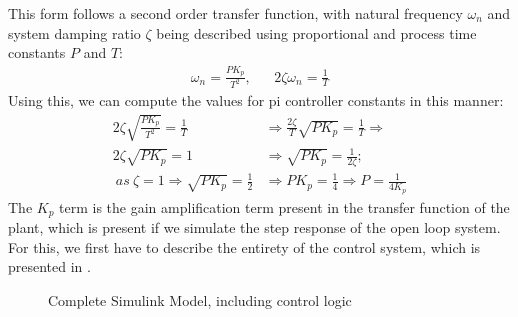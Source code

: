 This form follows a second order transfer function, with natural frequency $\omega_n$ and system damping ratio $\zeta$ being described using proportional and process time constants $P$ and $T$:
\begin{align*}
    \omega_n = \frac{P K_p}{T^2}, && 2 \zeta \omega_n = \frac{1}{T}
\end{align*}
Using this, we can compute the values for \gls{pi} controller constants in this manner:
\begin{equation}
    \begin{split}
        2 \zeta \sqrt{\frac{P K_p}{T^2}} = \frac{1}{T} &\Rightarrow \frac{2 \zeta}{T} \sqrt{P K_p} = \frac{1}{T} \Rightarrow \\
        2 \zeta \sqrt{P K_p} = 1 &\Rightarrow \sqrt{P K_p} = \frac{1}{2 \zeta}; \\
        \ as \ \zeta = 1 \Rightarrow \sqrt{P K_p} = \frac{1}{2} &\Rightarrow P K_p = \frac{1}{4} \Rightarrow P = \frac{1}{4 K_p}
    \end{split}
\end{equation}
The $K_p$ term is the gain amplification term present in the transfer function of the plant, which is present if we simulate the step response of the open loop system.
For this, we first have to describe the entirety of the control system, which is presented in .
\begin{figure}[!ht]
    \centering
    \caption{Complete Simulink Model, including control logic}
    \label{fig:discuinv}
\end{figure}

